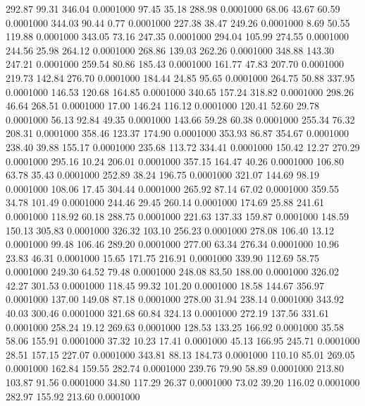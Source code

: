  292.87   99.31  346.04   0.0001000
  97.45   35.18  288.98   0.0001000
  68.06   43.67   60.59   0.0001000
 344.03   90.44    0.77   0.0001000
 227.38   38.47  249.26   0.0001000
   8.69   50.55  119.88   0.0001000
 343.05   73.16  247.35   0.0001000
 294.04  105.99  274.55   0.0001000
 244.56   25.98  264.12   0.0001000
 268.86  139.03  262.26   0.0001000
 348.88  143.30  247.21   0.0001000
 259.54   80.86  185.43   0.0001000
 161.77   47.83  207.70   0.0001000
 219.73  142.84  276.70   0.0001000
 184.44   24.85   95.65   0.0001000
 264.75   50.88  337.95   0.0001000
 146.53  120.68  164.85   0.0001000
 340.65  157.24  318.82   0.0001000
 298.26   46.64  268.51   0.0001000
  17.00  146.24  116.12   0.0001000
 120.41   52.60   29.78   0.0001000
  56.13   92.84   49.35   0.0001000
 143.66   59.28   60.38   0.0001000
 255.34   76.32  208.31   0.0001000
 358.46  123.37  174.90   0.0001000
 353.93   86.87  354.67   0.0001000
 238.40   39.88  155.17   0.0001000
 235.68  113.72  334.41   0.0001000
 150.42   12.27  270.29   0.0001000
 295.16   10.24  206.01   0.0001000
 357.15  164.47   40.26   0.0001000
 106.80   63.78   35.43   0.0001000
 252.89   38.24  196.75   0.0001000
 321.07  144.69   98.19   0.0001000
 108.06   17.45  304.44   0.0001000
 265.92   87.14   67.02   0.0001000
 359.55   34.78  101.49   0.0001000
 244.46   29.45  260.14   0.0001000
 174.69   25.88  241.61   0.0001000
 118.92   60.18  288.75   0.0001000
 221.63  137.33  159.87   0.0001000
 148.59  150.13  305.83   0.0001000
 326.32  103.10  256.23   0.0001000
 278.08  106.40   13.12   0.0001000
  99.48  106.46  289.20   0.0001000
 277.00   63.34  276.34   0.0001000
  10.96   23.83   46.31   0.0001000
  15.65  171.75  216.91   0.0001000
 339.90  112.69   58.75   0.0001000
 249.30   64.52   79.48   0.0001000
 248.08   83.50  188.00   0.0001000
 326.02   42.27  301.53   0.0001000
 118.45   99.32  101.20   0.0001000
  18.58  144.67  356.97   0.0001000
 137.00  149.08   87.18   0.0001000
 278.00   31.94  238.14   0.0001000
 343.92   40.03  300.46   0.0001000
 321.68   60.84  324.13   0.0001000
 272.19  137.56  331.61   0.0001000
 258.24   19.12  269.63   0.0001000
 128.53  133.25  166.92   0.0001000
  35.58   58.06  155.91   0.0001000
  37.32   10.23   17.41   0.0001000
  45.13  166.95  245.71   0.0001000
  28.51  157.15  227.07   0.0001000
 343.81   88.13  184.73   0.0001000
 110.10   85.01  269.05   0.0001000
 162.84  159.55  282.74   0.0001000
 239.76   79.90   58.89   0.0001000
 213.80  103.87   91.56   0.0001000
  34.80  117.29   26.37   0.0001000
  73.02   39.20  116.02   0.0001000
 282.97  155.92  213.60   0.0001000
